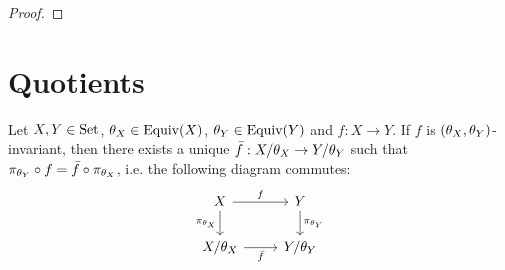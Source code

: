 \begin{ex}
	
\end{ex}

\begin{proof}
	
\end{proof}




































































\section{Quotients}

\begin{ex}
	Let $X, Y \in \text{Set}$, $\theta_X \in \operatorname*{\text{Equiv}}(X)$, $\theta_Y \in \operatorname*{\text{Equiv}}(Y)$ and $f:X \rightarrow Y$. If $f$ is $(\theta_X, \theta_Y)$-invariant, then there exists a unique $\bar{f}:X/\theta_X \rightarrow Y/\theta_Y$ such that $\pi_{\theta_Y} \circ f = \bar{f} \circ \pi_{\theta_X}$, i.e. the following diagram commutes:
	\[ 
	\begin{tikzcd}
		X  \arrow[r, "f"]  \arrow[d, "\pi_{\th_X}"']  & Y   \arrow[d, "\pi_{\th_Y}"]\\
		X/ \th_X \arrow[r, "\bar{f}"'] &  Y/ \th_Y \\
	\end{tikzcd}
	\]
\end{ex}

